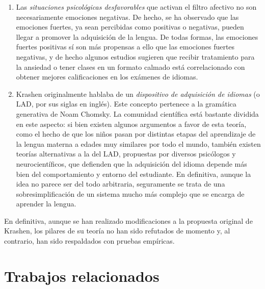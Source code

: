 \begin{enumerate}
	\item Las \textit{situaciones psicológicas desfavorables} que activan el filtro afectivo no son necesariamente emociones negativas. De hecho, se ha observado que las emociones fuertes, ya sean percibidas como positivas o negativas, pueden llegar a promover la adquisición de la lengua. De todas formas, las emociones fuertes positivas sí son más propensas a ello que las emociones fuertes negativas, y de hecho algunos estudios sugieren que recibir tratamiento para la ansiedad o tener clases en un formato calmado está correlacionado con obtener mejores calificaciones en los exámenes de idiomas. \autocite{MacIntyre}
	\item Krashen originalmente hablaba de un \textit{dispositivo de adquisición de idiomas} (o LAD, por sus siglas en inglés). Este concepto pertenece a la gramática generativa de Noam Chomsky. La comunidad científica está bastante dividida en este aspecto: si bien existen algunos argumentos a favor de esta teoría, como el hecho de que los niños pasan por distintas etapas del aprendizaje de la lengua materna a edades muy similares por todo el mundo, también existen teorías alternativas a la del LAD, propuestas por diversos psicólogos y neurocientíficos, que defienden que la adquisición del idioma depende más bien del comportamiento y entorno del estudiante. En definitiva, aunque la idea no parece ser del todo arbitraria, seguramente se trata de una sobresimplificación de un sistema mucho más complejo que se encarga de aprender la lengua. \autocite{Essay}
\end{enumerate}



En definitiva, aunque se han realizado modificaciones a la propuesta original de Krashen, los pilares de su teoría no han sido refutados de momento y, al contrario, han sido respaldados con pruebas empíricas.



\section{Trabajos relacionados}

